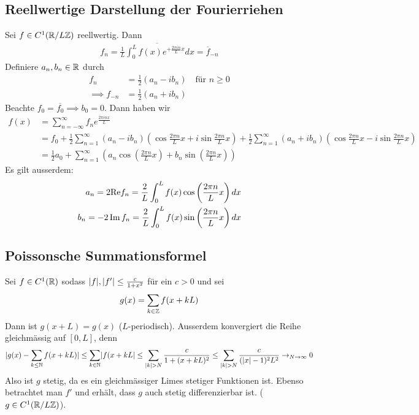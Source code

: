 \subsection{Reellwertige Darstellung der Fourierriehen}
Sei $f \in C^1(\mathbb{R}/L\mathbb{Z})$ reellwertig. Dann
\begin{align*}
	f_n = \overline{\frac{1}{L}\int_{0}^{L}f(x) e^{+ \frac{2 \pi in}{L}x}dx} = \overline{f}_{-n}
\end{align*}
Definiere $a_n, b_n \in \mathbb{R}$ durch
\begin{align*}
	f_n &= \frac{1}{2}(a_n - ib_n) \quad \text{für } n \geq 0\\
	\implies f_{-n} &= \frac{1}{2}(a_n + ib_n)
\end{align*}
Beachte $f_0 = \overline{f_0} \implies b_0 = 0$. Dann haben wir
\begin{align*}
	f(x) &= \sum_{n = -\infty}^{\infty}f_n e^{\frac{2\pi inx}{L}}\\
			 &=f_0 + \frac{1}{2} \sum_{n=1}^{\infty}(a_n - ib_n) \left(\cos \frac{2\pi n}{L}x + i \sin \frac{2\pi n}{L}x\right)	+ \frac{1}{2} \sum_{n = 1}^{\infty}(a_n + ib_n) \left(\cos \frac{2\pi n}{L}x - i \sin \frac{2\pi n}{L}x\right)\\
			 &= \frac{1}{2} a_0 + \sum_{n=1}^{\infty} \left(a_n \cos \left(\frac{2\pi n}{L}x\right) + b_n \sin \left(\frac{2\pi n}{L}x\right)\right)
\end{align*}
Es gilt ausserdem:
\begin{align*}
	a_n = 2 \text{Re} f_n = \frac{2}{L} \int_{0}^{L} f(x) \cos \left(\frac{2\pi n}{L}x\right)dx\\
	b_n = -2 \operatorname{Im} f_n = \frac{2}{L} \int_{0}^{L}f(x) \sin \left(\frac{2\pi n}{L}x\right)dx
\end{align*}

\subsection{Poissonsche Summationsformel}

Sei $f \in C^1(\mathbb{R})$ sodass $\vert f\vert, \vert f'\vert \leq \frac{c}{1 + x^2}$ für ein $c > 0$ und sei
\begin{align*}
	g(x) = \sum_{k \in \mathbb{Z}} f(x + kL)
\end{align*}
Dann ist $g(x + L) = g(x)$ ($L$-periodisch). Ausserdem konvergiert die Reihe gleichmässig auf $[0,L]$, denn
\begin{align*}
	\abs{g(x) - \sum_{k \leq \N} f(x + kL)} \leq \sum_{k \in \N} \abs{f(x + kL} \leq \sum_{\abs{k} > N} \frac{c}{1 + (x + kL)^2} \leq \sum_{\abs{k} > N} \frac{c}{(\abs{x} -1 )^2 L^2} \to_{N \to \infty} 0
\end{align*}
Also ist $g$ stetig, da es ein gleichmässiger Limes stetiger Funktionen ist. Ebenso betrachtet man $f'$ und erhält, dass $g$ auch stetig differenzierbar ist. ($g \in C^1(\mathbb{R}/L\mathbb{Z})$).\\

